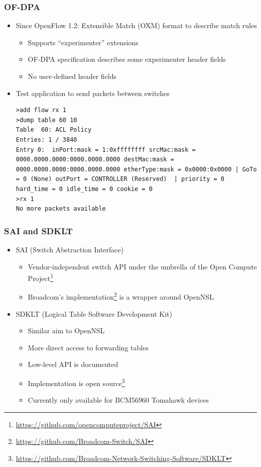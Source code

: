 \documentclass[12pt]{beamer}
\begin{document}
\begin{frame}[fragile]
\frametitle{OF-DPA}
\begin{itemize}
    \item Since OpenFlow 1.2: Extensible Match (OXM) format to describe match rules
    \begin{itemize}
        \item Supports ``experimenter'' extensions
        \item OF-DPA specification describes some experimenter header fields
        \item No user-defined header fields
    \end{itemize}
    \pause
    \item Test application to send packets between switches
\begin{lstlisting}
>add flow rx 1
>dump table 60 10
Table  60: ACL Policy
Entries: 1 / 3840
Entry 0:  inPort:mask = 1:0xffffffff srcMac:mask = 0000.0000.0000:0000.0000.0000 destMac:mask = 0000.0000.0000:0000.0000.0000 etherType:mask = 0x0000:0x0000 | GoTo = 0 (None) outPort = CONTROLLER (Reserved)  | priority = 0 hard_time = 0 idle_time = 0 cookie = 0
>rx 1
No more packets available
\end{lstlisting}
\end{itemize}
\end{frame}

\begin{frame}
\frametitle{SAI and SDKLT}
\begin{itemize}
    \item SAI (Switch Abstraction Interface)
    \begin{itemize}
        \item Vendor-independent switch API under the umbrella of the Open Compute Project\footnote{\url{https://github.com/opencomputeproject/SAI}}
        \item Broadcom's implementation\footnote{\url{https://github.com/Broadcom-Switch/SAI}} is a wrapper around OpenNSL
    \end{itemize}
\end{itemize}
\begin{itemize}
    \item SDKLT (Logical Table Software Development Kit)
    \begin{itemize}
        \item Similar aim to OpenNSL
        \item More direct access to forwarding tables
        \item Low-level API is documented
        \item Implementation is open source\footnote{\url{https://github.com/Broadcom-Network-Switching-Software/SDKLT}}
        \item Currently only available for BCM56960 Tomahawk devices
    \end{itemize}
\end{itemize}
\end{frame}
\end{document}
